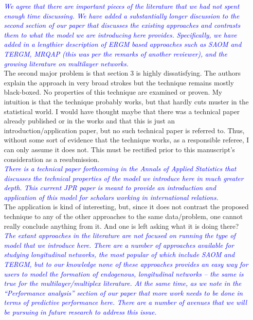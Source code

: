 \textcolor{blue}{\emph{
	We agree that there are important pieces of the literature that we had not spent enough time discussing. We have added a substantially longer discussion to the second section of our paper that discusses the existing approaches and contrasts them to what the model we are introducing here provides. Specifically, we have added in a lengthier description of ERGM based approaches such as SAOM and TERGM, MRQAP (this was per the remarks of another reviewer), and the growing literature on multilayer networks. 
}} \\

The second major problem is that section 3 is highly dissatisfying. The authors explain the approach in very broad strokes but the technique remains mostly black-boxed. No properties of this technique are examined or proven. My intuition is that the technique probably works, but that hardly cuts muster in the statistical world. I would have thought maybe that there was a technical paper already published or in the works and that this is just an introduction/application paper, but no such
technical paper is referred to. Thus, without some sort of evidence that the technique works, as a responsible referee, I can only assume it does not. This must be rectified prior to this manuscript's consideration as a resubmission. \\

\textcolor{blue}{\emph{
	There is a technical paper forthcoming in the Annals of Applied Statistics that discusses the technical properties of the model we introduce here in much greater depth. This current JPR paper is meant to provide an introduction and application of this model for scholars working in international relations. 
}} \\

The application is kind of interesting, but, since it does not contrast the proposed technique to any of the other approaches to the same data/problem, one cannot really conclude anything from it. And one is left asking what it is doing there? \\

\textcolor{blue}{\emph{
	The extant approaches in the literature are not focused on running the type of model that we introduce here. There are a number of approaches available for studying longitudinal networks, the most popular of which include SAOM and TERGM, but to our knowledge none of these approaches provides an easy way for users to model the formation of endogenous, longitudinal networks -- the same is true for the multilayer/multiplex literature.  
	At the same time, as we note in the ``Performance analysis'' section of our paper that more work needs to be done in terms of predictive performance here. There are a number of avenues that we will be pursuing in future research to address this issue.
}} \\

